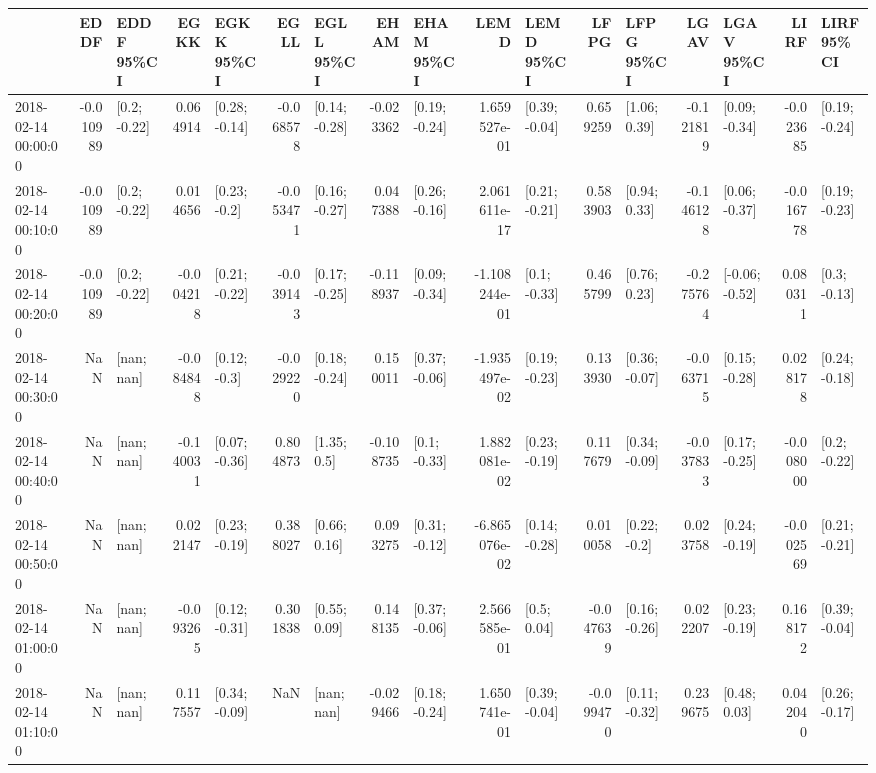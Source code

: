 \begin{tabular}{lrlrlrlrlrlrlrlrl}
\toprule
{} &      EDDF &      EDDF 95\%CI &      EGKK &      EGKK 95\%CI &      EGLL &      EGLL 95\%CI &      EHAM &      EHAM 95\%CI &          LEMD &      LEMD 95\%CI &      LFPG &      LFPG 95\%CI &      LGAV &      LGAV 95\%CI &      LIRF &      LIRF 95\%CI \\
\midrule
2018-02-14 00:00:00 & -0.010989 &    [0.2; -0.22] &  0.064914 &   [0.28; -0.14] & -0.068578 &   [0.14; -0.28] & -0.023362 &   [0.19; -0.24] &  1.659527e-01 &   [0.39; -0.04] &  0.659259 &    [1.06; 0.39] & -0.121819 &   [0.09; -0.34] & -0.023685 &   [0.19; -0.24] \\
2018-02-14 00:10:00 & -0.010989 &    [0.2; -0.22] &  0.014656 &    [0.23; -0.2] & -0.053471 &   [0.16; -0.27] &  0.047388 &   [0.26; -0.16] &  2.061611e-17 &   [0.21; -0.21] &  0.583903 &    [0.94; 0.33] & -0.146128 &   [0.06; -0.37] & -0.016778 &   [0.19; -0.23] \\
2018-02-14 00:20:00 & -0.010989 &    [0.2; -0.22] & -0.004218 &   [0.21; -0.22] & -0.039143 &   [0.17; -0.25] & -0.118937 &   [0.09; -0.34] & -1.108244e-01 &    [0.1; -0.33] &  0.465799 &    [0.76; 0.23] & -0.275764 &  [-0.06; -0.52] &  0.080311 &    [0.3; -0.13] \\
2018-02-14 00:30:00 &       NaN &      [nan; nan] & -0.084848 &    [0.12; -0.3] & -0.029220 &   [0.18; -0.24] &  0.150011 &   [0.37; -0.06] & -1.935497e-02 &   [0.19; -0.23] &  0.133930 &   [0.36; -0.07] & -0.063715 &   [0.15; -0.28] &  0.028178 &   [0.24; -0.18] \\
2018-02-14 00:40:00 &       NaN &      [nan; nan] & -0.140031 &   [0.07; -0.36] &  0.804873 &     [1.35; 0.5] & -0.108735 &    [0.1; -0.33] &  1.882081e-02 &   [0.23; -0.19] &  0.117679 &   [0.34; -0.09] & -0.037833 &   [0.17; -0.25] & -0.008000 &    [0.2; -0.22] \\
2018-02-14 00:50:00 &       NaN &      [nan; nan] &  0.022147 &   [0.23; -0.19] &  0.388027 &    [0.66; 0.16] &  0.093275 &   [0.31; -0.12] & -6.865076e-02 &   [0.14; -0.28] &  0.010058 &    [0.22; -0.2] &  0.023758 &   [0.24; -0.19] & -0.002569 &   [0.21; -0.21] \\
2018-02-14 01:00:00 &       NaN &      [nan; nan] & -0.093265 &   [0.12; -0.31] &  0.301838 &    [0.55; 0.09] &  0.148135 &   [0.37; -0.06] &  2.566585e-01 &     [0.5; 0.04] & -0.047639 &   [0.16; -0.26] &  0.022207 &   [0.23; -0.19] &  0.168172 &   [0.39; -0.04] \\
2018-02-14 01:10:00 &       NaN &      [nan; nan] &  0.117557 &   [0.34; -0.09] &       NaN &      [nan; nan] & -0.029466 &   [0.18; -0.24] &  1.650741e-01 &   [0.39; -0.04] & -0.099470 &   [0.11; -0.32] &  0.239675 &    [0.48; 0.03] &  0.042040 &   [0.26; -0.17] \\

\end{tabular}
